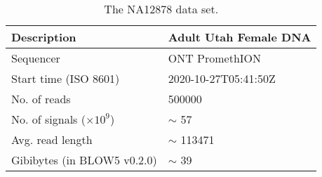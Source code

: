 \begin{table}
    \caption{\label{tab:data}The NA12878 data set.}
    \begin{tabular}{|l|l|}
        \hline
        Description & Adult Utah Female DNA\\
        \hline
	Sequencer & ONT PromethION\\
	Start time (ISO 8601) & 2020-10-27T05:41:50Z\\
	No. of reads & \num{500000}\\
	No. of signals ($\times 10^9$) & $\sim$ 57\\
	Avg. read length & $\sim$ \num{113471}\\
        \hline
	Gibibytes (in BLOW5 v0.2.0) & $\sim$ 39\\
	\hline
    \end{tabular}
\end{table}

